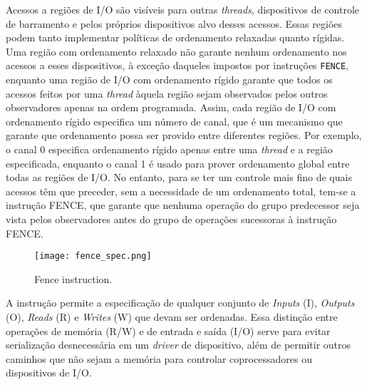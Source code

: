 		Acessos a regiões de I/O são visíveis para outras \textit{threads}, dispositivos de controle
		de barramento e pelos próprios dispositivos alvo desses acessos. Essas regiões podem tanto
		implementar políticas de ordenamento relaxadas quanto rígidas. Uma região com ordenamento
		relaxado não garante nenhum ordenamento nos acessos a esses dispositivos, à exceção daqueles
		impostos por instruções \texttt{FENCE}, enquanto uma região de I/O com ordenamento
		rígido garante que todos os acessos feitos por uma \textit{thread} àquela região sejam observados
		pelos outros observadores apenas na ordem programada. Assim, cada região de I/O com ordenamento
		rígido especifica um número de canal, que é um mecanismo que garante que ordenamento possa
		ser provido entre diferentes regiões. Por exemplo, o canal 0 especifica ordenamento rígido
		apenas entre uma \textit{thread} e a região especificada, enquanto o canal 1 é usado para prover
		ordenamento global entre todas as regiões de I/O. No entanto, para se ter um controle mais
		fino de quais acessos têm que preceder, sem a necessidade de um ordenamento total, tem-se
		a instrução FENCE, que garante que nenhuma operação do grupo predecessor seja vista
		pelos observadores antes do grupo de operações sucessoras à instrução FENCE.

		\begin{figure}[t]
			\centering
			\texttt{[image: fence\_spec.png]}
			\caption{Fence instruction.}
		\end{figure}

		A instrução permite a especificação de qualquer conjunto de \textit{Inputs} (I),
		\textit{Outputs} (O), \textit{Reads} (R) e \textit{Writes} (W) que devam ser
		ordenadas. Essa distinção entre operações de memória (R/W) e de entrada e saída (I/O)
		serve para evitar serialização desnecessária em um \textit{driver} de dispositivo, além
		de permitir outros caminhos que não sejam a memória para controlar coprocessadores ou
		dispositivos de I/O.


